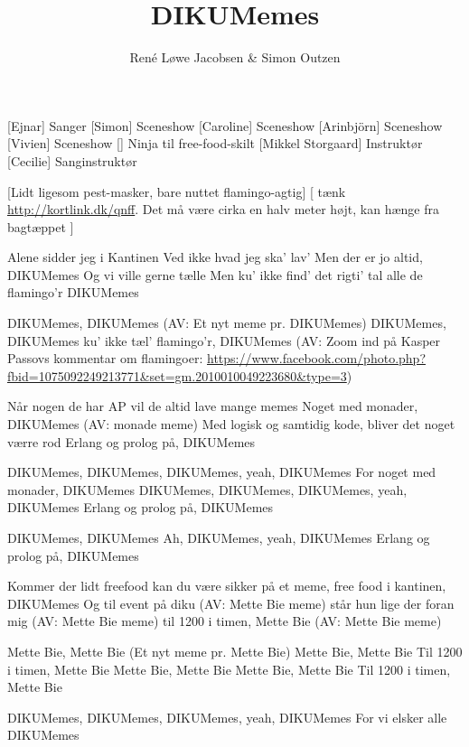 \documentclass[a4paper,11pt]{article}
\title{DIKUMemes}
\author{René Løwe Jacobsen \& Simon Outzen}
\begin{document}
\maketitle

\begin{roles}
[Ejnar] Sanger
[Simon] Sceneshow
[Caroline] Sceneshow
[Arinbjörn] Sceneshow
[Vivien] Sceneshow
[] Ninja til free-food-skilt
[Mikkel Storgaard] Instruktør
[Cecilie] Sanginstruktør
\end{roles}

\begin{props}
  [Lidt ligesom pest-masker, bare nuttet flamingo-agtig]
  \prop{}[ tænk \url{http://kortlink.dk/qnff}. Det må være cirka en halv meter
  højt, kan hænge fra bagtæppet ]
  
\end{props}
  

\begin{song}
%
Alene sidder jeg i Kantinen
Ved ikke hvad jeg ska' lav'
Men der er jo altid,
DIKUMemes
Og vi ville gerne tælle
Men ku' ikke find' det rigti' tal
alle de flamingo'r
DIKUMemes

DIKUMemes, DIKUMemes (AV: Et nyt meme pr. DIKUMemes)
DIKUMemes, DIKUMemes
ku' ikke tæl' flamingo'r, DIKUMemes (AV: Zoom ind på Kasper Passovs kommentar om flamingoer: \url{https://www.facebook.com/photo.php?fbid=1075092249213771&set=gm.2010010049223680&type=3})

Når nogen de har AP
vil de altid lave mange memes
Noget med monader, DIKUMemes (AV: monade meme)
Med logisk og samtidig kode,
bliver det noget værre rod
Erlang og prolog på, DIKUMemes

DIKUMemes, DIKUMemes,
DIKUMemes, yeah, DIKUMemes
For noget med monader, DIKUMemes
DIKUMemes, DIKUMemes,
DIKUMemes, yeah, DIKUMemes
Erlang og prolog på, DIKUMemes

DIKUMemes, DIKUMemes
Ah, DIKUMemes, yeah, DIKUMemes
Erlang og prolog på, DIKUMemes

Kommer der lidt freefood
kan du være sikker på et meme,
free food i kantinen, DIKUMemes
Og til event på diku (AV: Mette Bie meme)
står hun lige der foran mig (AV: Mette Bie meme)
til 1200 i timen, Mette Bie (AV: Mette Bie meme)

Mette Bie, Mette Bie (Et nyt meme pr. Mette Bie)
Mette Bie, Mette Bie
Til 1200 i timen, Mette Bie
Mette Bie, Mette Bie
Mette Bie, Mette Bie
Til 1200 i timen, Mette Bie

DIKUMemes, DIKUMemes,
DIKUMemes, yeah, DIKUMemes
For vi elsker alle DIKUMemes

\end{song}
\end{document}
